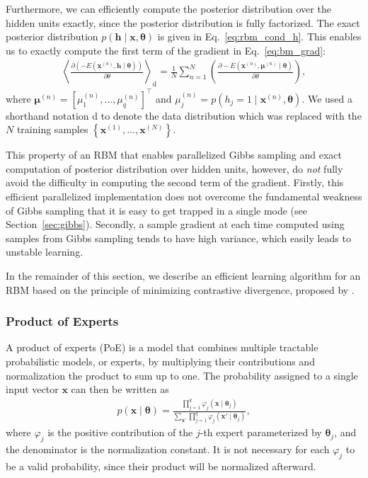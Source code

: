 \documentclass[dissertation,nocontribution]{aaltoseries}
\newcommand{\vect}[1]{\mathbf{#1}}
\newcommand{\vects}[1]{\boldsymbol{#1}}
\newcommand{\vh}[0]{\vect{h}}
\newcommand{\vx}[0]{\vect{x}}
\newcommand{\td}[0]{\text{d}}
\newcommand{\vmu}[0]{\vects{\mu}}
\newcommand{\TT}[0]{{\vects{\theta}}}
\begin{document}
Furthermore, %
we can efficiently
compute the posterior distribution over the hidden units
exactly, since the posterior distribution is fully
factorized. The exact posterior distribution ${p(\vh \mid
\vx, \TT)}$ is given in Eq.~\eqref{eq:rbm_cond_h}. This
enables us to exactly compute the first term of the
gradient in Eq.~\eqref{eq:bm_grad}:
\begin{align}
    \label{eq:rbm_grad}
    \left< \frac{\partial
    \left(-E(\vx^{(n)}, \vh\mid\TT)\right)}{\partial \theta}
    \right>_{\td} = 
    \frac{1}{N} \sum_{n=1}^N \left( \frac{\partial
    -E(\vx^{(n)}, \vmu^{(n)} \mid \TT)}{\partial \theta}
    \right),
\end{align}
where $\vmu^{(n)} = \left[ \mu_1^{(n)}, \dots, \mu_q^{(n)}
\right]^\top$ and $\mu_j^{(n)} = p(h_j=1 \mid \vx^{(n)},
\TT)$. We used a shorthand notation $\td$ to denote the data
distribution which was replaced with the $N$
training samples $\left\{ \vx^{(1)}, \dots,
\vx^{(N)}\right\}$. 

This property of an RBM that enables parallelized
Gibbs sampling and exact computation of posterior
distribution over hidden units, however, do \textit{not} fully avoid
the difficulty in computing the second term of the gradient.
Firstly, this efficient parallelized implementation does not
overcome the fundamental weakness of Gibbs sampling that it
is easy to get trapped in a single mode (see
Section~\ref{sec:gibbs}). Secondly, a sample gradient at
each time computed using samples from Gibbs sampling tends
to have high variance, which easily leads to unstable
learning.

In the remainder of this section, we describe an efficient
learning algorithm for an RBM based on the principle of
minimizing contrastive divergence, proposed by
\citet{Hinton2002}. 



\subsubsection{Product of Experts}
\label{sec:poe}

A product of experts (PoE) \citep{Hinton2002} is a model that
combines multiple tractable probabilistic models, or
experts, by multiplying their contributions and
normalization
the product to sum up to one. The probability assigned to a
single input vector $\vx$ can then be written as
\begin{align}
    \label{eq:poe}
    p(\vx \mid \TT) = \frac{\prod_{j=1}^q \varphi_j(\vx \mid
    \TT_j)}{\sum_{\vx'} \prod_{j=1}^q \varphi_j(\vx' \mid
    \TT_j)},
\end{align}
where $\varphi_j$ is the positive contribution of the $j$-th
expert parameterized by $\TT_j$, and the denominator is the
normalization constant. It is not necessary for each
$\varphi_j$ to be a valid probability, since their product
will be normalized afterward.
\end{document}
